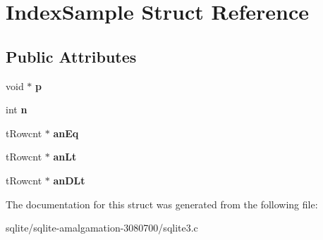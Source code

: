 \hypertarget{struct_index_sample}{\section{Index\+Sample Struct Reference}
\label{struct_index_sample}
}
\subsection*{Public Attributes}
\begin{DoxyCompactItemize}
\item 
\hypertarget{struct_index_sample_a539f00d3096fd379146e77e74b513dac}{void $\ast$ {\bfseries p}}\label{struct_index_sample_a539f00d3096fd379146e77e74b513dac}

\item 
\hypertarget{struct_index_sample_a89016f3b6580ee9c63c4ac78e2e6e76c}{int {\bfseries n}}\label{struct_index_sample_a89016f3b6580ee9c63c4ac78e2e6e76c}

\item 
\hypertarget{struct_index_sample_a048e60e638c6e0305812102366822e67}{t\+Rowcnt $\ast$ {\bfseries an\+Eq}}\label{struct_index_sample_a048e60e638c6e0305812102366822e67}

\item 
\hypertarget{struct_index_sample_a4853d16cdb7cf5099e8478471ae729de}{t\+Rowcnt $\ast$ {\bfseries an\+Lt}}\label{struct_index_sample_a4853d16cdb7cf5099e8478471ae729de}

\item 
\hypertarget{struct_index_sample_ab17baab68e2890d9939c3840987051c2}{t\+Rowcnt $\ast$ {\bfseries an\+D\+Lt}}\label{struct_index_sample_ab17baab68e2890d9939c3840987051c2}

\end{DoxyCompactItemize}


The documentation for this struct was generated from the following file\+:\begin{DoxyCompactItemize}
\item 
sqlite/sqlite-\/amalgamation-\/3080700/sqlite3.\+c\end{DoxyCompactItemize}
